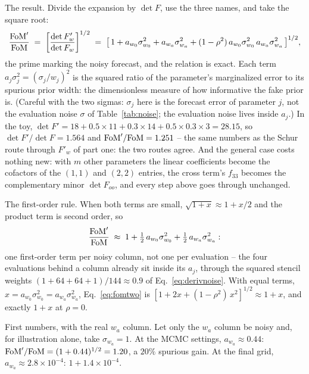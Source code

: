 \documentclass[11pt]{article}
\begin{document}
The result.  Divide the expansion by $\det F$, use the three names,
and take the square root:
\begin{equation}
  \frac{{\rm FoM}'}{{\rm FoM}} \;=\;
  \biggl[\frac{\det F'_w}{\det F_w}\biggr]^{1/2} \;=\;
  \bigl[\,1 + a_{w_0}\sigma_{w_0}^2 + a_{w_a}\sigma_{w_a}^2
  + (1 - \rho^2)\,a_{w_0}\sigma_{w_0}^2\,a_{w_a}\sigma_{w_a}^2
  \,\bigr]^{1/2} ,
  \label{eq:fomtwo}
\end{equation}
the prime marking the noisy forecast, and the relation is exact.  Each
term $a_j\sigma_j^2 = (\sigma_j/w_j)^2$ is the squared ratio of the
parameter's marginalized error to its spurious prior width: the
dimensionless measure of how informative the fake prior is.  (Careful
with the two sigmas: $\sigma_j$ here is the forecast error of
parameter $j$, not the evaluation noise $\sigma$ of
Table~\ref{tab:noise}; the evaluation noise lives inside $a_j$.)
In the toy, $\det F' = 18 + 0.5 \times 11 + 0.3 \times 14 +
0.5 \times 0.3 \times 3 = 28.15$, so $\det F'/\det F = 1.564$ and
${\rm FoM}'/{\rm FoM} = 1.251$ -- the same numbers as the Schur
route through $F'_w$ of part one: the two routes agree.  And the
general case costs nothing new: with $m$ other parameters the
linear coefficients become the cofactors of the $(1,1)$ and
$(2,2)$ entries, the cross term's $f_{33}$ becomes the
complementary minor $\det F_{oo}$, and every step above goes
through unchanged.

The first-order rule.  When both terms are small,
$\sqrt{1 + x} \approx 1 + x/2$ and the product term is second order,
so
\begin{equation*}
  \frac{{\rm FoM}'}{{\rm FoM}} \;\approx\;
  1 + \tfrac{1}{2}\,a_{w_0}\sigma_{w_0}^2
  + \tfrac{1}{2}\,a_{w_a}\sigma_{w_a}^2 :
\end{equation*}
one first-order term per noisy column, not one per evaluation -- the
four evaluations behind a column already sit inside its $a_j$, through
the squared stencil weights $(1 + 64 + 64 + 1)/144 \approx 0.9$ of
Eq.~\eqref{eq:derivnoise}.  With equal terms,
$x = a_{w_0}\sigma_{w_0}^2 = a_{w_a}\sigma_{w_a}^2$,
Eq.~\eqref{eq:fomtwo} is
$[1 + 2x + (1 - \rho^2)\,x^2]^{1/2} \approx 1 + x$, and exactly
$1 + x$ at $\rho = 0$.

First numbers, with the real $w_a$ column.  Let only the $w_a$ column
be noisy and, for illustration alone, take $\sigma_{w_a} = 1$.  At the
MCMC settings, $a_{w_a} \approx 0.44$:
${\rm FoM}'/{\rm FoM} = (1 + 0.44)^{1/2} = 1.20$, a $20\%$ spurious
gain.  At the final grid, $a_{w_a} \approx 2.8\times10^{-4}$:
$1 + 1.4\times10^{-4}$.
\end{document}
